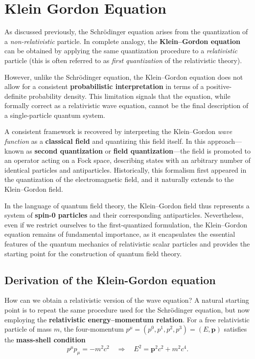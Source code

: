 \section{Klein Gordon Equation}

As discussed previously, the Schrödinger equation arises from the quantization of a \textit{non-relativistic} particle.
In complete analogy, the \textbf{Klein–Gordon equation} can be obtained by applying the same quantization procedure to a \textit{relativistic} particle (this is often referred to as \textit{first quantization} of the relativistic theory).

However, unlike the Schrödinger equation, the Klein–Gordon equation does not allow for a consistent \textbf{probabilistic interpretation} in terms of a positive-definite probability density.
This limitation signals that the equation, while formally correct as a relativistic wave equation, cannot be the final description of a single-particle quantum system.

A consistent framework is recovered by interpreting the Klein–Gordon \textit{wave function} as a \textbf{classical field} and quantizing this field itself.
In this approach—known as \textbf{second quantization} or \textbf{field quantization}—the field is promoted to an operator acting on a Fock space, describing states with an arbitrary number of identical particles and antiparticles.
Historically, this formalism first appeared in the quantization of the electromagnetic field, and it naturally extends to the Klein–Gordon field.

In the language of quantum field theory, the Klein–Gordon field thus represents a system of \textbf{spin-0 particles} and their corresponding antiparticles.
Nevertheless, even if we restrict ourselves to the first-quantized formulation, the Klein–Gordon equation remains of fundamental importance, as it encapsulates the essential features of the quantum mechanics of relativistic scalar particles and provides the starting point for the construction of quantum field theory.

\subsection{Derivation of the Klein-Gordon equation}

How can we obtain a relativistic version of the wave equation?
A natural starting point is to repeat the same procedure used for the Schrödinger equation, but now employing the \textbf{relativistic energy–momentum relation}.
For a free relativistic particle of mass \( m \), the four-momentum \( p^\mu = (p^0, p^1, p^2, p^3) = (E, \mathbf{p}) \) satisfies the \textbf{mass-shell condition}
\[
    p^\mu p_\mu = -m^2 c^2 \quad \Rightarrow \quad E^2 = \mathbf{p}^2 c^2 + m^2 c^4.
\]

